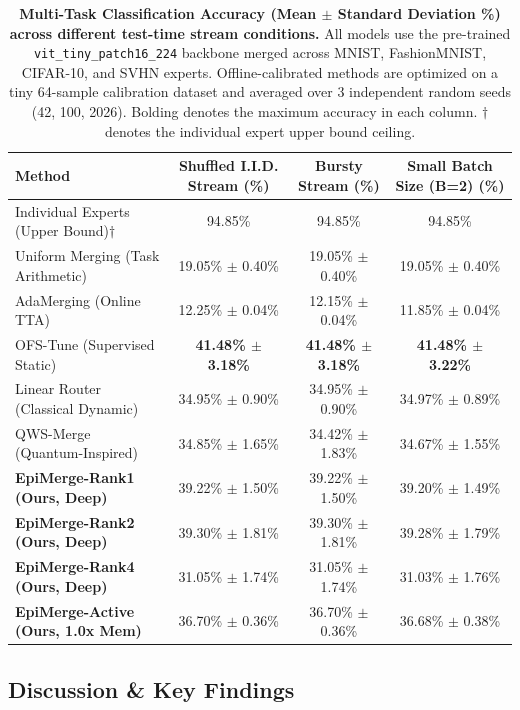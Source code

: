 \begin{table}[t]
\centering
\caption{\textbf{Multi-Task Classification Accuracy (Mean $\pm$ Standard Deviation \%) across different test-time stream conditions.} All models use the pre-trained \texttt{vit\_tiny\_patch16\_224} backbone merged across MNIST, FashionMNIST, CIFAR-10, and SVHN experts. Offline-calibrated methods are optimized on a tiny 64-sample calibration dataset and averaged over 3 independent random seeds (42, 100, 2026). Bolding denotes the maximum accuracy in each column. $\dagger$ denotes the individual expert upper bound ceiling.}
\label{tab:main_results}
\vskip 0.15in
\begin{tabular}{lccc}
\toprule
\textbf{Method} & \textbf{Shuffled I.I.D. Stream (\%)} & \textbf{Bursty Stream (\%)} & \textbf{Small Batch Size (B=2) (\%)} \\
\midrule
Individual Experts (Upper Bound)$\dagger$ & 94.85\% & 94.85\% & 94.85\% \\
\midrule
Uniform Merging (Task Arithmetic) & 19.05\% $\pm$ 0.40\% & 19.05\% $\pm$ 0.40\% & 19.05\% $\pm$ 0.40\% \\
AdaMerging (Online TTA) & 12.25\% $\pm$ 0.04\% & 12.15\% $\pm$ 0.04\% & 11.85\% $\pm$ 0.04\% \\
OFS-Tune (Supervised Static) & \textbf{41.48\% $\pm$ 3.18\%} & \textbf{41.48\% $\pm$ 3.18\%} & \textbf{41.48\% $\pm$ 3.22\%} \\
\midrule
Linear Router (Classical Dynamic) & 34.95\% $\pm$ 0.90\% & 34.95\% $\pm$ 0.90\% & 34.97\% $\pm$ 0.89\% \\
QWS-Merge (Quantum-Inspired) & 34.85\% $\pm$ 1.65\% & 34.42\% $\pm$ 1.83\% & 34.67\% $\pm$ 1.55\% \\
\midrule
\textbf{EpiMerge-Rank1 (Ours, Deep)} & 39.22\% $\pm$ 1.50\% & 39.22\% $\pm$ 1.50\% & 39.20\% $\pm$ 1.49\% \\
\textbf{EpiMerge-Rank2 (Ours, Deep)} & 39.30\% $\pm$ 1.81\% & 39.30\% $\pm$ 1.81\% & 39.28\% $\pm$ 1.79\% \\
\textbf{EpiMerge-Rank4 (Ours, Deep)} & 31.05\% $\pm$ 1.74\% & 31.05\% $\pm$ 1.74\% & 31.03\% $\pm$ 1.76\% \\
\textbf{EpiMerge-Active (Ours, 1.0x Mem)} & 36.70\% $\pm$ 0.36\% & 36.70\% $\pm$ 0.36\% & 36.68\% $\pm$ 0.38\% \\
\bottomrule
\end{tabular}
\end{table}

\subsection{Discussion \& Key Findings}

